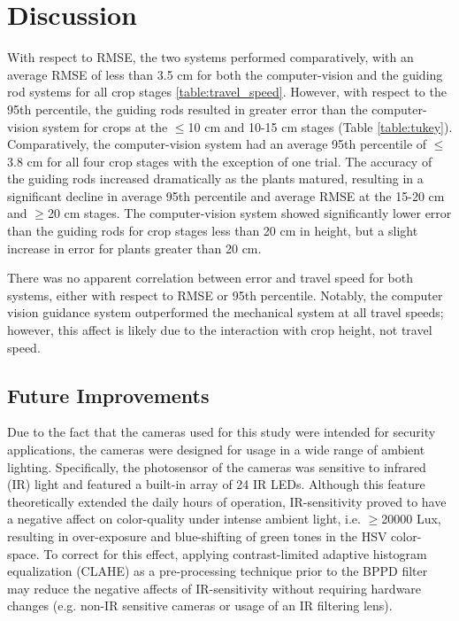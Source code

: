 \documentclass[authoryear]{elsarticle}
\begin{document}

\section{Discussion}
With respect to RMSE, the two systems performed comparatively, with an
average RMSE of less than 3.5 cm for both the computer-vision and the
guiding rod systems for all crop stages \ref{table:travel_speed}. However, with
respect to the 95th percentile, the guiding rods resulted in
greater error than the computer-vision system for crops at the $\le$10
cm and 10-15 cm stages (Table \ref{table:tukey}). Comparatively, the computer-vision
system had an average 95th percentile of $\le$3.8 cm for all four
crop stages with the exception of one trial. The accuracy of the guiding rods increased dramatically
as the plants matured, resulting in a significant decline in average
95th percentile and average RMSE at the 15-20 cm and $\ge$20 cm
stages. The computer-vision system showed significantly lower error
than the guiding rods for crop stages less than 20 cm in height, but a
slight increase in error for plants greater than 20 cm. 

There was no apparent correlation between error and travel speed for
both systems, either with respect to RMSE or 95th percentile. Notably,
the computer vision guidance system outperformed the mechanical system
at all travel speeds; however, this affect is likely due to the
interaction with crop height, not travel speed.

\subsection{Future Improvements}
Due to the fact that the cameras used for this study were intended for
security applications, the cameras were designed for usage in a wide
range of ambient lighting. Specifically, the photosensor of the
cameras was sensitive to infrared (IR) light and featured a built-in
array of 24 IR LEDs. Although this feature theoretically extended the
daily hours of operation, IR-sensitivity proved to have a negative
affect on color-quality under intense ambient light, i.e. $\ge$20000
Lux, resulting in over-exposure and blue-shifting of green tones in
the HSV color-space. To correct for this effect, applying
contrast-limited adaptive histogram equalization (CLAHE) as a
pre-processing technique prior to the BPPD filter may reduce the
negative affects of IR-sensitivity without requiring hardware changes
(e.g. non-IR sensitive cameras or usage of an IR filtering lens).
\end{document}
